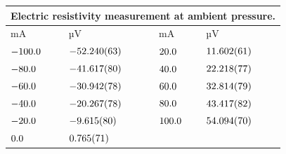 \begin{tabular}{|p{}|p{}||p{}|p{}|}
\hline
\multicolumn{4}{|c|}{Electric resistivity measurement at ambient pressure.}\\
\hline
mA&µV&mA&µV\\
\hline
$\num{-100.0\pm 0.0}$&$\num{-52.24\pm 0.063}$&$\num{20.0\pm 0.0}$&$\num{11.602\pm 0.061}$\\
$\num{-80.0\pm 0.0}$&$\num{-41.617\pm 0.08}$&$\num{40.0\pm 0.0}$&$\num{22.218\pm 0.077}$\\
$\num{-60.0\pm 0.0}$&$\num{-30.942\pm 0.078}$&$\num{60.0\pm 0.0}$&$\num{32.814\pm 0.079}$\\
$\num{-40.0\pm 0.0}$&$\num{-20.267\pm 0.078}$&$\num{80.0\pm 0.0}$&$\num{43.417\pm 0.082}$\\
$\num{-20.0\pm 0.0}$&$\num{-9.615\pm 0.08}$&$\num{100.0\pm 0.0}$&$\num{54.094\pm 0.07}$\\
$\num{0.0\pm 0.0}$&$\num{0.765\pm 0.071}$&&\\
\hline
\end{tabular}